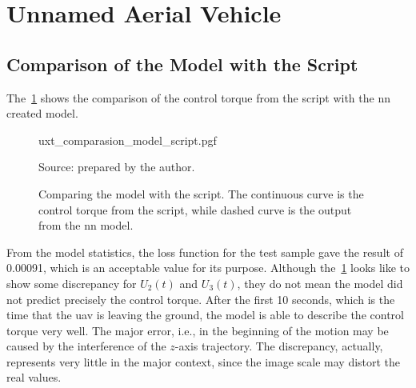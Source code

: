 \section{Unnamed Aerial Vehicle}

\subsection{Comparison of the Model with the Script}

The~\cref{fig:uxt_comparison_model_script} shows the comparison of the control torque from the script with the \gls*{nn} created model.
%
\begin{figure}[!htb]
    \centering
    \caption[Comparing the model with the script]{Comparing the model with the script. The continuous curve is the control torque from the script, while dashed curve is the output from the \gls*{nn} model.}
    {uxt_comparasion_model_script.pgf}

    {\footnotesize Source: prepared by the author.}
    \label{fig:uxt_comparison_model_script}
\end{figure}

From the model statistics, the loss function for the test sample gave the result of 0.00091, which is an acceptable value for its purpose.
Although the~\cref{fig:uxt_comparison_model_script} looks like to show some discrepancy for \(U_2(t)\) and \(U_3(t)\), they do not mean the model did not predict precisely the control torque. 
After the first 10 seconds, which is the time that the \gls*{uav} is leaving the ground, the model is able to describe the control torque very well.
The major error, i.e., in the beginning of the motion may be caused by the interference of the \(z\)-axis trajectory. The discrepancy, actually, represents very little in the major context, since the image scale may distort the real values.